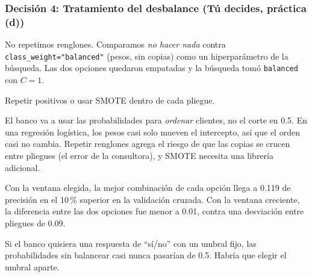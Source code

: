 \documentclass[11pt, letterpaper]{article}
\begin{document}
\subsubsection*{Decisión 4: Tratamiento del desbalance (Tú decides, práctica (d))}
\begin{description}[leftmargin=0pt, itemsep=2pt]
    \item[Decisión.] No repetimos renglones. Comparamos \emph{no hacer nada} contra \texttt{class\_weight="balanced"} (pesos, sin copias) como un hiperparámetro de la búsqueda. Las dos opciones quedaron empatadas y la búsqueda tomó \texttt{balanced} con $C = 1$.
    \item[Alternativa descartada.] Repetir positivos o usar SMOTE dentro de cada pliegue.
    \item[Por qué.] El banco va a usar las probabilidades para \emph{ordenar} clientes, no el corte en 0.5. En una regresión logística, los pesos casi solo mueven el intercepto, así que el orden casi no cambia. Repetir renglones agrega el riesgo de que las copias se crucen entre pliegues (el error de la consultora), y SMOTE necesita una librería adicional.
    \item[Evidencia.] Con la ventana elegida, la mejor combinación de cada opción llega a 0.119 de precisión en el 10\,\% superior en la validación cruzada. Con la ventana creciente, la diferencia entre las dos opciones fue menor a 0.01, contra una desviación entre pliegues de 0.09.
    \item[Qué perdemos.] Si el banco quisiera una respuesta de ``sí/no'' con un umbral fijo, las probabilidades sin balancear casi nunca pasarían de 0.5. Habría que elegir el umbral aparte.
\end{description}
\end{document}
